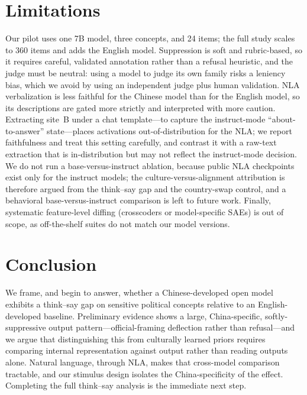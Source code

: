 \documentclass[11pt]{article}
\begin{document}
\section{Limitations}
Our pilot uses one 7B model, three concepts, and 24 items; the full study
scales to 360 items and adds the English model. Suppression is soft and
rubric-based, so it requires careful, validated annotation rather than a
refusal heuristic, and the judge must be neutral: using a model to judge its
own family risks a leniency bias, which we avoid by using an independent judge
plus human validation. NLA verbalization is less faithful for the Chinese
model than for the English model, so its descriptions are gated more strictly
and interpreted with more caution. Extracting site~B under a chat template---to
capture the instruct-mode ``about-to-answer'' state---places activations
out-of-distribution for the NLA; we report faithfulness and treat this setting
carefully, and contrast it with a raw-text extraction that is in-distribution
but may not reflect the instruct-mode decision. We do not run a
base-versus-instruct ablation, because public NLA checkpoints exist only for
the instruct models; the culture-versus-alignment attribution is therefore
argued from the think--say gap and the country-swap control, and a behavioral
base-versus-instruct comparison is left to future work. Finally, systematic
feature-level diffing (crosscoders or model-specific SAEs) is out of scope, as
off-the-shelf suites do not match our model versions.

\section{Conclusion}
We frame, and begin to answer, whether a Chinese-developed open model exhibits
a think--say gap on sensitive political concepts relative to an
English-developed baseline. Preliminary evidence shows a large,
China-specific, softly-suppressive output pattern---official-framing
deflection rather than refusal---and we argue that distinguishing this from
culturally learned priors requires comparing internal representation against
output rather than reading outputs alone. Natural language, through NLA, makes
that cross-model comparison tractable, and our stimulus design isolates the
China-specificity of the effect. Completing the full think--say analysis is
the immediate next step.



\end{document}
